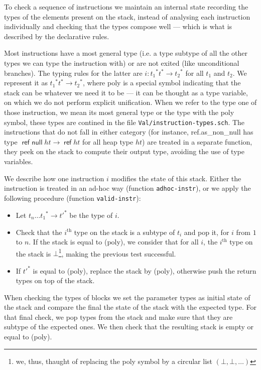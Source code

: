 \documentclass[a4paper,11pt]{article}
\DeclareMathOperator{\reft}{\textsf{ref}}
\DeclareMathOperator{\refnullt}{\textsf{ref null}}
\begin{document}
To check a sequence of instructions we maintain an internal state recording the
types of the elements present on the stack, instead of analysing each
instruction individually and checking that the types compose well --- which is
what is described by the declarative rules.

Most instructions have a most general type (i.e. a type subtype of all the other
types we can type the instruction with) or are not exited (like unconditional
branches). The typing rules for the latter are $i:{t_1}^*t^*\to {t_2}^*$ for all
$t_1$ and $t_2$. We represent it as ${t_1}^*t^*\to {t_2}^*$, where \textsf{poly}
is a special symbol indicating that the stack can be whatever we need it to be
--- it can be thought as a type variable, on which we do not perform explicit
unification. When we refer to the type one of those instruction, we mean its
most general type or the type with the \textsf{poly} symbol, these types are
contined in the file \texttt{Val/instruction-types.sch}. The instructions that
do not fall in either category (for instance, \textsf{ref.as\_non\_null} has
type $\refnullt ht\to \reft ht$ for all heap type $ht$) are treated in a
separate function, they peek on the stack to compute their output type, avoiding
the use of type variables.

We describe how one instruction $i$ modifies the state of this stack. Either the
instruction is treated in an ad-hoc way (function \texttt{adhoc-instr}), or we
apply the following procedure (function \texttt{valid-instr}):

\begin{itemize}
\item Let ${t_n\ldots t_1}^*\to{t'}^*$ be the type of $i$.
\item Check that the $i^{\text{th}}$ type on the stack is a subtype of $t_i$ and
  pop it, for $i$ from $1$ to $n$. If the stack is equal to \textsf{(poly)}, we
  consider that for all $i$, the $i^{\text{th}}$ type on the stack is
  $\bot$\footnote{we, thus, thaught of replacing the \textsf{poly} symbol by a
  circular list $(\bot,\bot,\ldots)$}, making the previous test successful.
\item If ${t'}^*$ is equal to \textsf{(poly)}, replace the stack by
  \textsf{(poly)}, otherwise push the return types on top of the stack.
\end{itemize}

When checking the types of blocks we set the parameter types as initial state of
the stack and compare the final the state of the stack with the expected type.
For that final check, we pop types from the stack and make sure that they are
subtype of the expected ones. We then check that the resulting stack is empty or
equal to \textsf{(poly)}.
\end{document}
